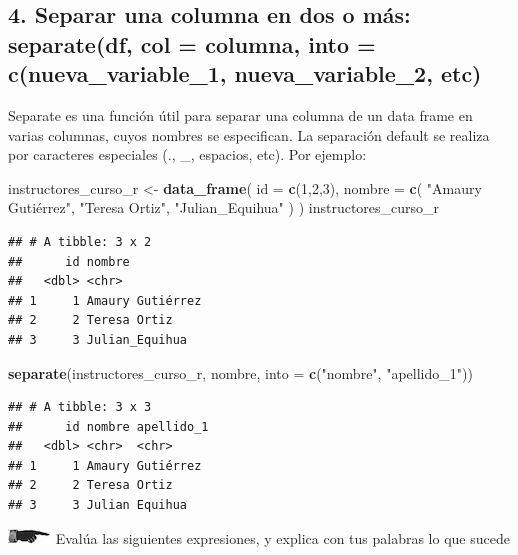 \documentclass[]{book}
\newenvironment{Shaded}{\begin{snugshade}}{\end{snugshade}}
\newcommand{\KeywordTok}[1]{\textcolor[rgb]{0.13,0.29,0.53}{\textbf{#1}}}
\newcommand{\DataTypeTok}[1]{\textcolor[rgb]{0.13,0.29,0.53}{#1}}
\newcommand{\DecValTok}[1]{\textcolor[rgb]{0.00,0.00,0.81}{#1}}
\newcommand{\StringTok}[1]{\textcolor[rgb]{0.31,0.60,0.02}{#1}}
\newcommand{\NormalTok}[1]{#1}
\theoremstyle{definition}
\theoremstyle{definition}
\theoremstyle{definition}
\theoremstyle{remark}
\begin{document}
\subsection{4. Separar una columna en dos o más: separate(df, col =
columna, into = c(nueva\_variable\_1, nueva\_variable\_2,
etc)}\label{separar-una-columna-en-dos-o-mas-separatedf-col-columna-into-cnueva_variable_1-nueva_variable_2-etc}

Separate es una función útil para separar una columna de un data frame
en varias columnas, cuyos nombres se especifican. La separación default
se realiza por caracteres especiales (., \_, espacios, etc). Por
ejemplo:

\begin{Shaded}
\begin{Highlighting}[]
\NormalTok{instructores_curso_r <-}\StringTok{ }\KeywordTok{data_frame}\NormalTok{(}
  \DataTypeTok{id =} \KeywordTok{c}\NormalTok{(}\DecValTok{1}\NormalTok{,}\DecValTok{2}\NormalTok{,}\DecValTok{3}\NormalTok{),}
  \DataTypeTok{nombre =} \KeywordTok{c}\NormalTok{(}
    \StringTok{"Amaury Gutiérrez"}\NormalTok{,}
    \StringTok{"Teresa Ortiz"}\NormalTok{,}
    \StringTok{"Julian_Equihua"}
\NormalTok{  )}
\NormalTok{)}
\NormalTok{instructores_curso_r}
\end{Highlighting}
\end{Shaded}

\begin{verbatim}
## # A tibble: 3 x 2
##      id nombre          
##   <dbl> <chr>           
## 1     1 Amaury Gutiérrez
## 2     2 Teresa Ortiz    
## 3     3 Julian_Equihua
\end{verbatim}

\begin{Shaded}
\begin{Highlighting}[]
\KeywordTok{separate}\NormalTok{(instructores_curso_r, nombre, }\DataTypeTok{into =} \KeywordTok{c}\NormalTok{(}\StringTok{"nombre"}\NormalTok{, }\StringTok{"apellido_1"}\NormalTok{))}
\end{Highlighting}
\end{Shaded}

\begin{verbatim}
## # A tibble: 3 x 3
##      id nombre apellido_1
##   <dbl> <chr>  <chr>     
## 1     1 Amaury Gutiérrez 
## 2     2 Teresa Ortiz     
## 3     3 Julian Equihua
\end{verbatim}

\includegraphics{./imagenes/manicule2.jpg} Evalúa las siguientes
expresiones, y explica con tus palabras lo que sucede
\end{document}
